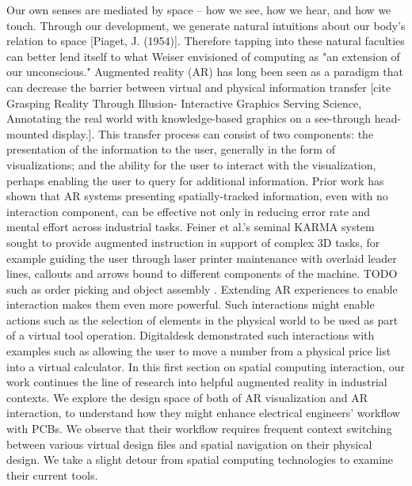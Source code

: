 \documentclass [11pt, proquest] {uwthesis}[2020/02/24]
\begin{document}
Our own senses are mediated by space -- how we see, how we hear, and how we touch. Through our development, we generate natural intuitions about our body's relation to space [Piaget, J. (1954)]. Therefore tapping into these natural faculties can better lend itself to what Weiser envisioned of computing as "an extension of our unconscious." 
Augmented reality (AR) has long been seen as a paradigm that can decrease the barrier between virtual and physical information transfer [cite Grasping Reality Through Illusion- Interactive Graphics Serving Science, Annotating the real world with knowledge-based graphics on a see-through head-mounted display.].
This transfer process can consist of two components: the presentation of the information to the user, generally in the form of visualizations; and the ability for the user to interact with the visualization, perhaps enabling the user to query for additional information.
Prior work has shown that AR systems presenting spatially-tracked information, even with no interaction component, can be effective not only in reducing error rate and mental effort across industrial tasks.
Feiner et al.’s seminal KARMA system \cite{Feiner1993Knowledge-basedReality} sought to provide augmented instruction in support of complex 3D tasks, for example guiding the user through laser printer maintenance with overlaid leader lines, callouts and arrows bound to different components of the machine. 
TODO such as order picking \cite{Schwerdtfeger2008SupportingReality} and object assembly \cite{Caudell1992AugmentedProcesses, Tang2003ComparativeAssembly}.
Extending AR experiences to enable interaction makes them even more powerful.
Such interactions might enable actions such as the selection of elements in the physical world to be used as part of a virtual tool operation.
Digitaldesk \cite{Wellner1993InteractingDigitaldesk} demonstrated such interactions with examples such as allowing the user to move a number from a physical price list into a virtual calculator.
In this first section on spatial computing interaction, our work continues the line of research into helpful augmented reality in industrial contexts. We explore the design space of both of AR visualization and AR interaction, to understand how they might enhance electrical engineers' workflow with PCBs. We observe that their workflow requires frequent context switching between various virtual design files and spatial navigation on their physical design. We take a slight detour from spatial computing technologies to examine their current tools.
\end{document}
